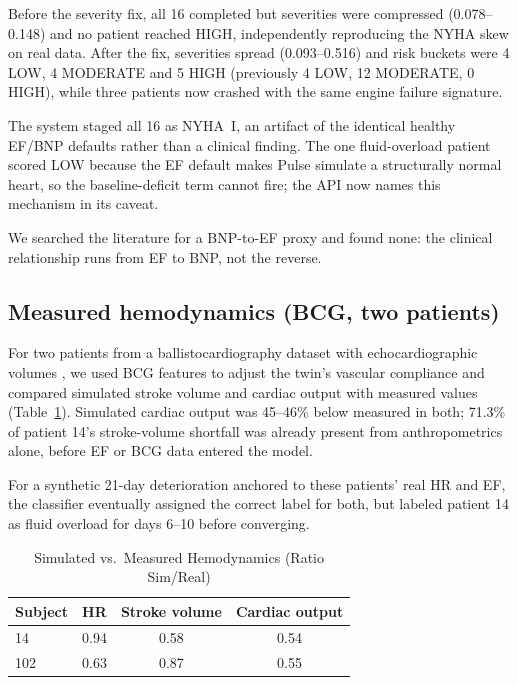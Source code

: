 \documentclass[conference]{IEEEtran}
\begin{document}
Before the severity fix, all 16 completed but severities were compressed (0.078--0.148) and no patient reached HIGH, independently reproducing the NYHA skew on real data. After the fix, severities spread (0.093--0.516) and risk buckets were 4 LOW, 4 MODERATE and 5 HIGH (previously 4 LOW, 12 MODERATE, 0 HIGH), while three patients now crashed with the same engine failure signature.

The system staged all 16 as NYHA~I, an artifact of the identical healthy EF/BNP defaults rather than a clinical finding. The one fluid-overload patient scored LOW because the EF default makes Pulse simulate a structurally normal heart, so the baseline-deficit term cannot fire; the API now names this mechanism in its caveat.

We searched the literature for a BNP-to-EF proxy and found none: the clinical relationship runs from EF to BNP, not the reverse.



\subsection{Measured hemodynamics (BCG, two patients)}\label{sec:bcg}
For two patients from a ballistocardiography dataset with echocardiographic volumes \cite{zhan2025bcg}, we used BCG features to adjust the twin's vascular compliance and compared simulated stroke volume and cardiac output with measured values (Table~\ref{tab:bcg}). Simulated cardiac output was 45--46\% below measured in both; 71.3\% of patient 14's stroke-volume shortfall was already present from anthropometrics alone, before EF or BCG data entered the model.

For a synthetic 21-day deterioration anchored to these patients' real HR and EF, the classifier eventually assigned the correct label for both, but labeled patient 14 as fluid overload for days 6--10 before converging.

\begin{table}[!t]
\centering
\caption{Simulated vs.\ Measured Hemodynamics (Ratio Sim/Real)}
\label{tab:bcg}
\footnotesize
\begin{tabular}{@{}lccc@{}}
\toprule
\textbf{Subject} & \textbf{HR} & \textbf{Stroke volume} & \textbf{Cardiac output} \\
\midrule
14 & 0.94 & 0.58 & 0.54 \\
102 & 0.63 & 0.87 & 0.55 \\
\bottomrule
\end{tabular}
\end{table}
\end{document}
